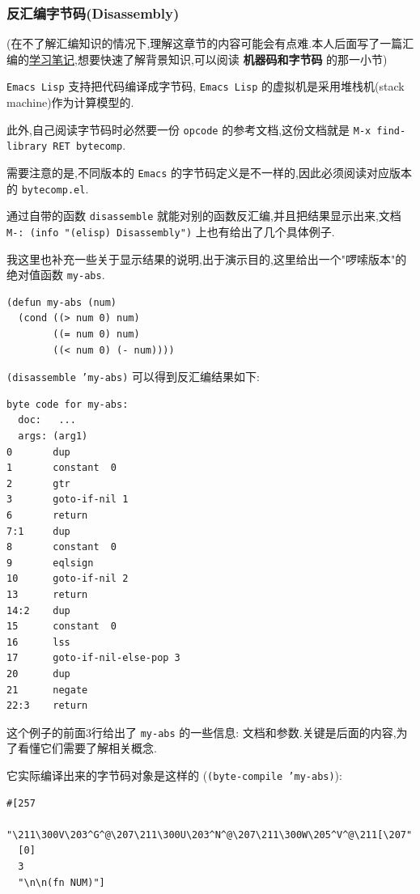 \documentclass[11pt]{article}
\begin{document}
\subsubsection{反汇编字节码(Disassembly)}
\label{sec:org7e7a147}

(在不了解汇编知识的情况下,理解这章节的内容可能会有点难.本人后面写了一篇汇编的\href{file:///docs/posts/2020/12/assembly.html}{学习笔记},想要快速了解背景知识,可以阅读 \textbf{机器码和字节码} 的那一小节)

\texttt{Emacs Lisp} 支持把代码编译成字节码, \texttt{Emacs Lisp} 的虚拟机是采用堆栈机(stack machine)作为计算模型的.

此外,自己阅读字节码时必然要一份 \texttt{opcode} 的参考文档,这份文档就是 \texttt{M-x find-library RET bytecomp}.

需要注意的是,不同版本的 \texttt{Emacs} 的字节码定义是不一样的,因此必须阅读对应版本的 \texttt{bytecomp.el}.

通过自带的函数 \texttt{disassemble} 就能对别的函数反汇编,并且把结果显示出来,文档 \texttt{M-: (info "(elisp) Disassembly")} 上也有给出了几个具体例子.

我这里也补充一些关于显示结果的说明,出于演示目的,这里给出一个"啰嗦版本"的绝对值函数 \texttt{my-abs}.

\begin{verbatim}
(defun my-abs (num)
  (cond ((> num 0) num)
        ((= num 0) num)
        ((< num 0) (- num))))
\end{verbatim}

\texttt{(disassemble 'my-abs)} 可以得到反汇编结果如下:

\begin{verbatim}
byte code for my-abs:
  doc:   ...
  args: (arg1)
0       dup
1       constant  0
2       gtr
3       goto-if-nil 1
6       return
7:1     dup
8       constant  0
9       eqlsign
10      goto-if-nil 2
13      return
14:2    dup
15      constant  0
16      lss
17      goto-if-nil-else-pop 3
20      dup
21      negate
22:3    return
\end{verbatim}

这个例子的前面3行给出了 \texttt{my-abs} 的一些信息: 文档和参数.关键是后面的内容,为了看懂它们需要了解相关概念.

它实际编译出来的字节码对象是这样的 (\texttt{(byte-compile 'my-abs)}):

\begin{verbatim}
#[257
  "\211\300V\203^G^@\207\211\300U\203^N^@\207\211\300W\205^V^@\211[\207"
  [0]
  3
  "\n\n(fn NUM)"]
\end{verbatim}
\end{document}
